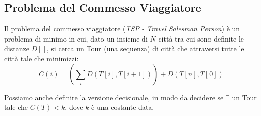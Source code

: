 \documentclass[a4paper,11pt]{book}
\begin{document}
\subsection{Problema del Commesso Viaggiatore}

Il problema del commesso viaggiatore (\emph{TSP - Travel Salesman Person}) \`e un problema di minimo in cui, dato un insieme di $N$ citt\`a tra cui sono definite le distanze $D[]$, si cerca un Tour (una sequenza) di citt\`a che attraversi tutte le citt\`a tale che minimizzi: $$C(i) = (\sum_{i} D(T[i], T[i+1])) + D(T[n], T[0])$$

Possiamo anche definire la versione decisionale, in modo da decidere se $\exists$ un Tour tale che $C(T) < k$, dove $k$ \`e una costante data.

\end{document}

